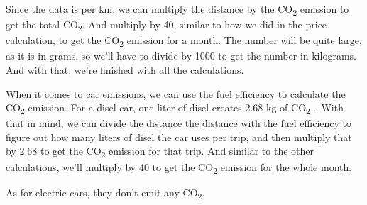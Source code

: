 Since the data is per km, we can multiply the distance by the \unit{CO_{2}} emission to get the total \unit{CO_{2}}.
And multiply by 40, similar to how we did in the price calculation, to get the \unit{CO_{2}} emission for a month.
The number will be quite large, as it is in grams, so we'll have to divide by 1000 to get the number in kilograms.
And with that, we're finished with all the calculations.

When it comes to car emissions, we can use the fuel efficiency to calculate the \unit{CO_{2}} emission.
For a disel car, one liter of disel creates 2.68 kg of \unit{CO_{2}}~\cite{co2_car}.
With that in mind, we can divide the distance the distance with the fuel efficiency to figure out how many liters of
disel the car uses per trip, and then multiply that by 2.68 to get the \unit{CO_{2}} emission for that trip.
And similar to the other calculations, we'll multiply by 40 to get the \unit{CO_{2}} emission for the whole month.

As for electric cars, they don't emit any \unit{CO_{2}}.


